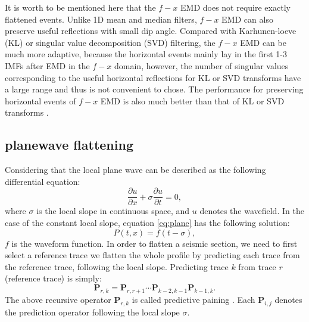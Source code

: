 It is worth to be mentioned here that the $f-x$ EMD does not require exactly flattened events. Unlike 1D mean and median filters, $f-x$ EMD can also preserve useful reflections with small dip angle. Compared with Karhunen-loeve (KL) or singular value decomposition (SVD) filtering, the $f-x$ EMD can be much more adaptive, because the horizontal events mainly lay in the first 1-3 IMFs after EMD in the $f-x$ domain, however, the number of singular values corresponding to the useful horizontal reflections for KL or SVD transforms have a large range and thus is not convenient to chose. The performance for preserving horizontal events of $f-x$ EMD is also much better than that of KL or SVD transforms \cite[]{yangkang2015}.

\subsection{plane\new{-}wave flattening}
Considering that the local plane wave can be described as the following differential equation: 
\begin{equation}
\label{eq:plane}
\frac{\partial u}{\partial x}+\sigma\frac{\partial u}{\partial t} = 0,
\end{equation}
where $\sigma$ is the local slope in continuous space, and $u$ denotes the wavefield. In the case of the constant local slope, equation \ref{eq:plane} has the following solution:
\begin{equation}
\label{eq:planesolu}
P(t,x) = f(t-\sigma),
\end{equation}
 $f$ is the waveform function. In order to flatten a seismic section, we need to first select a reference trace we flatten the whole profile by predicting each trace from the reference trace, following the local slope. Predicting trace $k$ from trace $r$ (reference trace) is simply:
\begin{equation}
\label{eq:pre}
\mathbf{P}_{r,k} = \mathbf{P}_{r,r+1}\cdots\mathbf{P}_{k-2,k-1}\mathbf{P}_{k-1,k}.
\end{equation}
The above recursive operator $\mathbf{P}_{r,k}$ is called predictive paining \cite[]{fomel2010painting}.
Each $\mathbf{P}_{i,j}$ denotes the prediction operator following the local slope $\sigma$.

